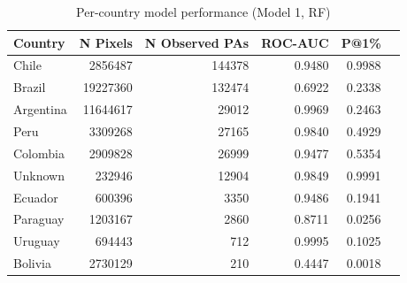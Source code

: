 \begin{table}[h]
\centering
\begin{tabular}{lrrrrr}
\toprule
Country & N Pixels & N Observed PAs & ROC-AUC & P@1\% \\
\midrule
Chile & 2856487 & 144378 & 0.9480 & 0.9988 \\
Brazil & 19227360 & 132474 & 0.6922 & 0.2338 \\
Argentina & 11644617 & 29012 & 0.9969 & 0.2463 \\
Peru & 3309268 & 27165 & 0.9840 & 0.4929 \\
Colombia & 2909828 & 26999 & 0.9477 & 0.5354 \\
Unknown & 232946 & 12904 & 0.9849 & 0.9991 \\
Ecuador & 600396 & 3350 & 0.9486 & 0.1941 \\
Paraguay & 1203167 & 2860 & 0.8711 & 0.0256 \\
Uruguay & 694443 & 712 & 0.9995 & 0.1025 \\
Bolivia & 2730129 & 210 & 0.4447 & 0.0018 \\
\bottomrule
\end{tabular}
\caption{Per-country model performance (Model 1, RF)}
\label{tab:country_breakdown_rf}
\end{table}
